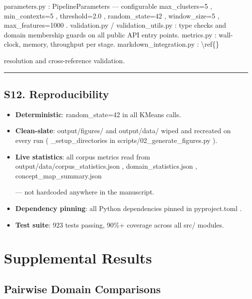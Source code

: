 \documentclass[
]{article}
\providecommand{\tightlist}{%
  \setlength{\itemsep}{0pt}\setlength{\parskip}{0pt}}
\numberwithin{equation}{section}
\renewcommand{\texttt}[1]{%
    \colorbox{codebg}{\color{codefg}\ttfamily #1}%
}
\begin{document}
\texttt{parameters.py}: \texttt{PipelineParameters} --- configurable
\texttt{max\_clusters=5}, \texttt{min\_contexts=5},
\texttt{threshold=2.0}, \texttt{random\_state=42},
\texttt{window\_size=5}, \texttt{max\_features=1000}.
\texttt{validation.py}/\texttt{validation\_utils.py}: type checks and
domain membership guards on all public API entry points.
\texttt{metrics.py}: wall-clock, memory, throughput per stage.
\texttt{markdown\_integration.py}: \texttt{\textbackslash{}ref\{\}}
resolution and cross-reference validation.

\begin{center}\rule{0.5\linewidth}{0.5pt}\end{center}

\subsection{S12. Reproducibility}\label{s12.-reproducibility}

\begin{itemize}
\tightlist
\item
  \textbf{Deterministic}: \texttt{random\_state=42} in all KMeans calls.
\item
  \textbf{Clean-slate}: \texttt{output/figures/} and
  \texttt{output/data/} wiped and recreated on every run
  (\texttt{\_setup\_directories} in
  \texttt{scripts/02\_generate\_figures.py}).
\item
  \textbf{Live statistics}: all corpus metrics read from
  \texttt{output/data/corpus\_statistics.json},
  \texttt{domain\_statistics.json}, \texttt{concept\_map\_summary.json}
  --- not hardcoded anywhere in the manuscript.
\item
  \textbf{Dependency pinning}: all Python dependencies pinned in
  \texttt{pyproject.toml}.
\item
  \textbf{Test suite}: 923 tests passing, 90\%+ coverage across all
  \texttt{src/} modules.
\end{itemize}

\newpage

\section{Supplemental Results}\label{sec:supplemental_results}

\subsection{Pairwise Domain
Comparisons}\label{pairwise-domain-comparisons}
\end{document}
